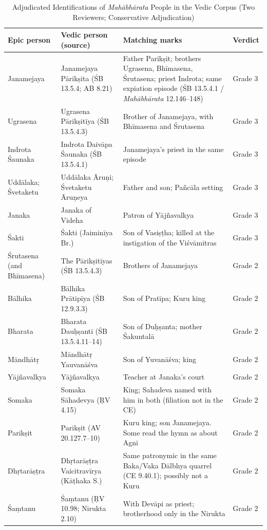 \documentclass[journal]{IEEEtran}
\newcommand{\MBh}{\textit{Mahābhārata}}
\begin{document}
\begin{table}[!t]
\caption{Adjudicated Identifications of \MBh{} People in the Vedic Corpus (Two Reviewers; Conservative Adjudication)}
\label{tab:results}
\centering\footnotesize
\begin{tabularx}{\textwidth}{@{}>{\raggedright}p{2.9cm} >{\raggedright}p{4.3cm} X >{\raggedright\arraybackslash}p{2.4cm}@{}}
\toprule
Epic person & Vedic person (source) & Matching marks & Verdict \\
\midrule
Janamejaya & Janamejaya Pārikṣita (ŚB 13.5.4; AB 8.21) & Father Parikṣit; brothers Ugrasena, Bhīmasena, Śrutasena; priest Indrota; same expiation episode (ŚB 13.5.4.1 / \MBh{} 12.146--148) & Grade 3 \\
Ugrasena & Ugrasena Pārikṣitīya (ŚB 13.5.4.3) & Brother of Janamejaya, with Bhīmasena and Śrutasena & Grade 3 \\
Indrota Śaunaka & Indrota Daivāpa Śaunaka (ŚB 13.5.4.1) & Janamejaya's priest in the same episode & Grade 3 \\
Uddālaka; Śvetaketu & Uddālaka Āruṇi; Śvetaketu Āruṇeya & Father and son; Pañcāla setting & Grade 3 \\
Janaka & Janaka of Videha & Patron of Yājñavalkya & Grade 3 \\
Śakti & Śakti (Jaiminīya Br.) & Son of Vasiṣṭha; killed at the instigation of the Viśvāmitras & Grade 3 \\
\midrule
Śrutasena (and Bhīmasena) & The Pārikṣitīyas (ŚB 13.5.4.3) & Brothers of Janamejaya & Grade 2 \\
Bālhika & Bālhika Prātipīya (ŚB 12.9.3.3) & Son of Pratīpa; Kuru king & Grade 2 \\
Bharata & Bharata Dauḥṣanti (ŚB 13.5.4.11--14) & Son of Duḥṣanta; mother Śakuntalā & Grade 2 \\
Māndhātṛ & Māndhātṛ Yauvanāśva & Son of Yuvanāśva; king & Grade 2 \\
Yājñavalkya & Yājñavalkya & Teacher at Janaka's court & Grade 2 \\
Somaka & Somaka Sāhadevya (ṚV 4.15) & King; Sahadeva named with him in both (filiation not in the CE) & Grade 2 \\
Parikṣit & Parikṣit (AV 20.127.7--10) & Kuru king; son Janamejaya. Some read the hymn as about Agni & Grade 2 \\
Dhṛtarāṣṭra & Dhṛtarāṣṭra Vaicitravīrya (Kāṭhaka S.) & Same patronymic in the same Baka/Vaka Dālbhya quarrel (CE 9.40.1); possibly not a Kuru & Grade 2 \\
Śaṃtanu & Śaṃtanu (ṚV 10.98; Nirukta 2.10) & With Devāpi as priest; brotherhood only in the Nirukta & Grade 2 \\

\end{tabularx}
\end{table}
\end{document}
